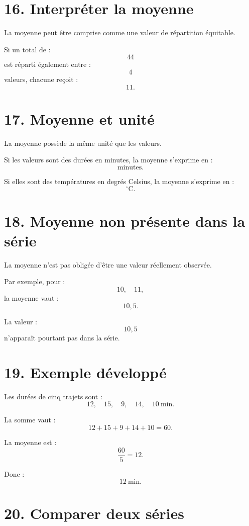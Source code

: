 \section{16. Interpréter la moyenne}

La moyenne peut être comprise comme une valeur de répartition équitable.


Si un total de :
\[
44
\]
est réparti également entre :
\[
4
\]
valeurs, chacune reçoit :
\[
11.
\]

\section{17. Moyenne et unité}

La moyenne possède la même unité que les valeurs.

Si les valeurs sont des durées en minutes, la moyenne s'exprime en :
\[
\text{minutes}.
\]

Si elles sont des températures en degrés Celsius, la moyenne s'exprime en :
\[
^\circ\text{C}.
\]

\section{18. Moyenne non présente dans la série}

La moyenne n'est pas obligée d'être une valeur réellement observée.

Par exemple, pour :
\[
10,\quad11,
\]
la moyenne vaut :
\[
10{,}5.
\]

La valeur :
\[
10{,}5
\]
n'apparaît pourtant pas dans la série.

\section{19. Exemple développé}

Les durées de cinq trajets sont :
\[
12,\quad15,\quad9,\quad14,\quad10\ \text{min}.
\]

La somme vaut :
\[
12+15+9+14+10=60.
\]

La moyenne est :
\[
\dfrac{60}{5}=12.
\]

Donc :
\[
\boxed{12\ \text{min}}.
\]

\section{20. Comparer deux séries}

